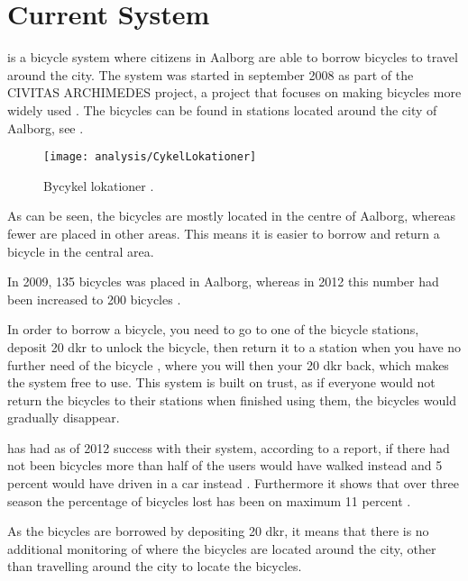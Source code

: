 \section{Current System}


\bycykel is a bicycle system where citizens in Aalborg are able to borrow bicycles to travel around the city.
The system was started in september 2008 as part of the CIVITAS ARCHIMEDES project, a project that focuses on making bicycles more widely used \citep{misc:aalborgcykling}.
The bicycles can be found in stations located around the city of Aalborg, see .

\begin{figure}
	\centering
	\texttt{[image: analysis/CykelLokationer]}
	\caption{Bycykel lokationer \citep{misc:aalborgbycykel}.}
	\label{fig:CykelLokationer}
\end{figure}

As can be seen, the bicycles are mostly located in the centre of Aalborg, whereas fewer are placed in other areas.
This means it is easier to borrow and return a bicycle in the central area.

In 2009, 135 bicycles was placed in Aalborg, whereas in 2012 this number had been increased to 200 bicycles \citep{misc:aalborgcykling}.

In order to borrow a bicycle, you need to go to one of the bicycle stations, deposit 20 dkr to unlock the bicycle, then return it to a station when you have no further need of the bicycle \citep{misc:aalborgbycykelregler}, where you will then your 20 dkr back, which makes the system free to use.
This system is built on trust, as if everyone would not return the bicycles to their stations when finished using them, the bicycles would gradually disappear.

\bycykel has had as of 2012 success with their system, according to a report, if there had not been bicycles more than half of the users would have walked instead and 5 percent would have driven in a car instead \citep{misc:aalborgcykling}.
Furthermore it shows that over three season the percentage of bicycles lost has been on maximum 11 percent \citep{misc:aalborgcykling}.

As the bicycles are borrowed by depositing 20 dkr, it means that there is no additional monitoring of where the bicycles are located around the city, other than travelling around the city to locate the bicycles.

